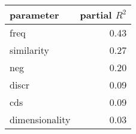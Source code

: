 \begin{tabular}{lr}
\toprule
      parameter &  partial $R^2$ \\
\midrule
           freq &    0.43 \\
     similarity &    0.27 \\
            neg &    0.20 \\
          discr &    0.09 \\
            cds &    0.09 \\
 dimensionality &    0.03 \\
\bottomrule
\end{tabular}
